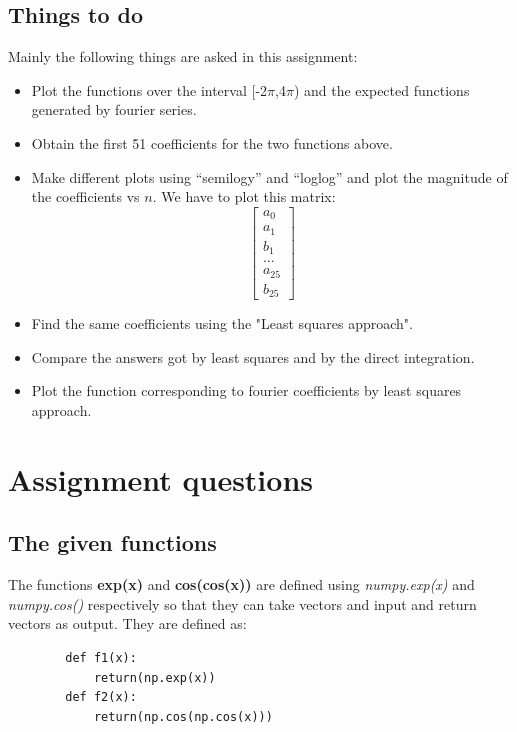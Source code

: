 \documentclass[11pt, a4paper]{article}
\begin{document}
    \subsection{Things to do}
    Mainly the following things are asked in this assignment:
    \begin{itemize}
        \item Plot the functions over the interval [-2$\pi$,4$\pi$) and the expected functions generated by fourier series.
        \item Obtain the first 51 coefficients for the two functions above.
        \item Make different plots using “semilogy” and “loglog” and plot the
magnitude of the coefficients vs $n$. We have to plot this matrix:
            \[
            \begin{bmatrix}
                a_0\\
                a_1\\
                b_1\\
                ...\\
                a_{25}\\
                b_{25}
            \end{bmatrix}
            \]
        \item Find the same coefficients using the "Least squares approach".
        \item Compare the answers got by least squares and by the direct integration.
        \item Plot the function corresponding to fourier coefficients by least squares approach.
    \end{itemize}

\section{Assignment questions}
    \subsection{The given functions}
    The functions \textbf{exp(x)} and \textbf{cos(cos(x))} are defined using \textit{numpy.exp(x)} and \textit{numpy.cos()} respectively so that they can take vectors and input and return vectors as output. They are defined as:
    \begin{verbatim}
        def f1(x):
            return(np.exp(x))
        def f2(x):
            return(np.cos(np.cos(x)))
    \end{verbatim}
\end{document}
